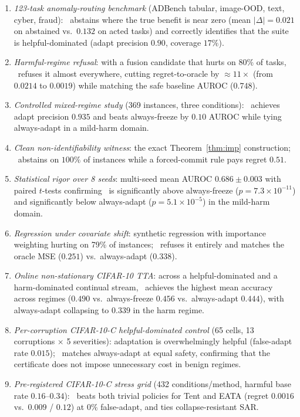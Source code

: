 \begin{enumerate}
\item \emph{123-task anomaly-routing benchmark} (ADBench tabular,
    image-OOD, text, cyber, fraud): \KGA\ abstains where the true benefit
    is near zero (mean $|\Delta| = 0.021$ on abstained vs.\ $0.132$ on
    acted tasks) and correctly identifies that the suite is helpful-dominated
    (adapt precision $0.90$, coverage $17\%$).
\item \emph{Harmful-regime refusal}: with a fusion candidate that hurts on
    80\% of tasks, \KGA\ refuses it almost everywhere, cutting regret-to-oracle
    by $\approx 11{\times}$ (from $0.0214$ to $0.0019$) while matching the
    safe baseline AUROC ($0.748$).
\item \emph{Controlled mixed-regime study} (369 instances, three conditions):
    \KGA\ achieves adapt precision $0.935$ and beats always-freeze by
    $0.10$ AUROC while tying always-adapt in a mild-harm domain.
\item \emph{Clean non-identifiability witness}: the exact Theorem~\ref{thm:imp}
    construction; \KGA\ abstains on $100\%$ of instances while a forced-commit
    rule pays regret $0.51$.
\item \emph{Statistical rigor over 8 seeds}: multi-seed mean AUROC
    $0.686 \pm 0.003$ with paired $t$-tests confirming \KGA\ is significantly
    above always-freeze ($p = 7.3 \times 10^{-11}$) and significantly below
    always-adapt ($p = 5.1 \times 10^{-5}$) in the mild-harm domain.
\item \emph{Regression under covariate shift}: synthetic regression with
    importance weighting hurting on 79\% of instances; \KGA\ refuses it
    entirely and matches the oracle MSE ($0.251$) vs.\ always-adapt ($0.338$).
\item \emph{Online non-stationary CIFAR-10 TTA}: across a helpful-dominated
    and a harm-dominated continual stream, \KGA\ achieves the highest mean
    accuracy across regimes ($0.490$ vs.\ always-freeze $0.456$ vs.\
    always-adapt $0.444$), with always-adapt collapsing to $0.339$ in the
    harm regime.
\item \emph{Per-corruption CIFAR-10-C helpful-dominated control} (65 cells,
    13 corruptions $\times$ 5 severities): adaptation is overwhelmingly
    helpful (false-adapt rate $0.015$); \KGA\ matches always-adapt at equal
    safety, confirming that the certificate does not impose unnecessary cost
    in benign regimes.
\item \emph{Pre-registered CIFAR-10-C stress grid} (432 conditions/method,
    harmful base rate $0.16$--$0.34$): \KGA\ beats both trivial policies for
    Tent and EATA (regret $0.0016$ vs.\ $0.009$ / $0.12$) at $0\%$
    false-adapt, and ties collapse-resistant SAR.
\end{enumerate}

